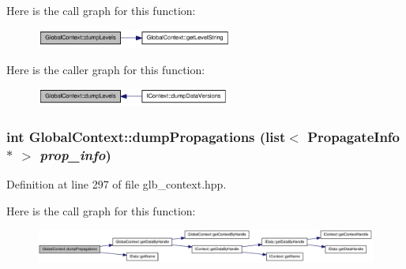 Here is the call graph for this function:\nopagebreak
\begin{figure}[H]
\begin{center}
\leavevmode
\includegraphics[width=183pt]{class_global_context_a016ede40f469516e58cdc0a720d77bd7_cgraph}
\end{center}
\end{figure}


Here is the caller graph for this function:\nopagebreak
\begin{figure}[H]
\begin{center}
\leavevmode
\includegraphics[width=181pt]{class_global_context_a016ede40f469516e58cdc0a720d77bd7_icgraph}
\end{center}
\end{figure}
\hypertarget{class_global_context_a6a4ed0adbb91872d956babaf32e3466c}{
\subsubsection[{dumpPropagations}]{\setlength{\rightskip}{0pt plus 5cm}int GlobalContext::dumpPropagations (list$<$ {\bf PropagateInfo} $\ast$ $>$ {\em prop\_\-info})}}
\label{class_global_context_a6a4ed0adbb91872d956babaf32e3466c}


Definition at line 297 of file glb\_\-context.hpp.

Here is the call graph for this function:\nopagebreak
\begin{figure}[H]
\begin{center}
\leavevmode
\includegraphics[width=420pt]{class_global_context_a6a4ed0adbb91872d956babaf32e3466c_cgraph}
\end{center}
\end{figure}


